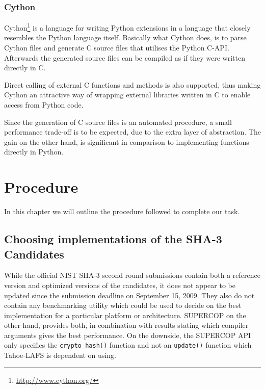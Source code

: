 \documentclass[english,12pt,a4paper]{book}
\begin{document}
\subsection{Cython}
Cython\footnote{\url{http://www.cython.org/}} is a language for writing Python
extensions in a language that closely resembles the Python language itself.
Basically what Cython does, is to parse Cython files and generate C source files
that utilises the Python C-API. Afterwards the generated source files can be
compiled as if they were written directly in C.

Direct calling of external C functions and methods is also supported, thus
making Cython an attractive way of wrapping external libraries written in C to
enable access from Python code.

Since the generation of C source files is an automated procedure, a small
performance trade-off is to be expected, due to the extra layer of abstraction.
The gain on the other hand, is significant in comparison to implementing
functions directly in Python.

\chapter{Procedure}

%

In this chapter we will outline the procedure followed to complete our task.

\section{Choosing implementations of the SHA-3 Candidates}

While the official \ac{NIST} \ac{SHA}-3 second round submissions contain both
a reference version and optimized versions of the candidates, it does not
appear to be updated since the submission deadline on September 15, 2009. They
also do not contain any benchmarking utility which could be used to decide on
the best implementation for a particular platform or architecture. \ac{SUPERCOP}
on the other hand, provides both, in combination with results stating which
compiler arguments gives the best performance. On the downside, the
\ac{SUPERCOP} \ac{API} only specifies the \texttt{crypto\_hash()} function and
not an \texttt{update()} function which Tahoe-\ac{LAFS} is dependent on using.
\end{document}
